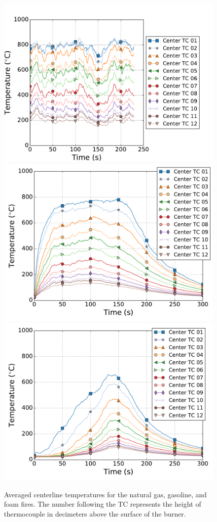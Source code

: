 \documentclass[twoside]{uocthesis}
\begin{document}
{\begin{figure}[p]
  \centering
  \includegraphics[width=.625\columnwidth]{../Figures/FHNG_TC_Plume_Avg}\\
  \includegraphics[width=.625\columnwidth]{../Figures/FHGAS_TC_Plume_Avg}\\
  \includegraphics[width=.625\columnwidth]{../Figures/FHPUF_TC_Plume_Avg}\\
  \caption[Averaged centerline temperatures for the natural gas, gasoline, and foam fires]{Averaged centerline temperatures for the natural gas, gasoline, and foam fires. The number following the TC represents the height of thermocouple in decimeters above the surface of the burner.}
  \label{Temp}
\end{figure}

}
\end{document}
